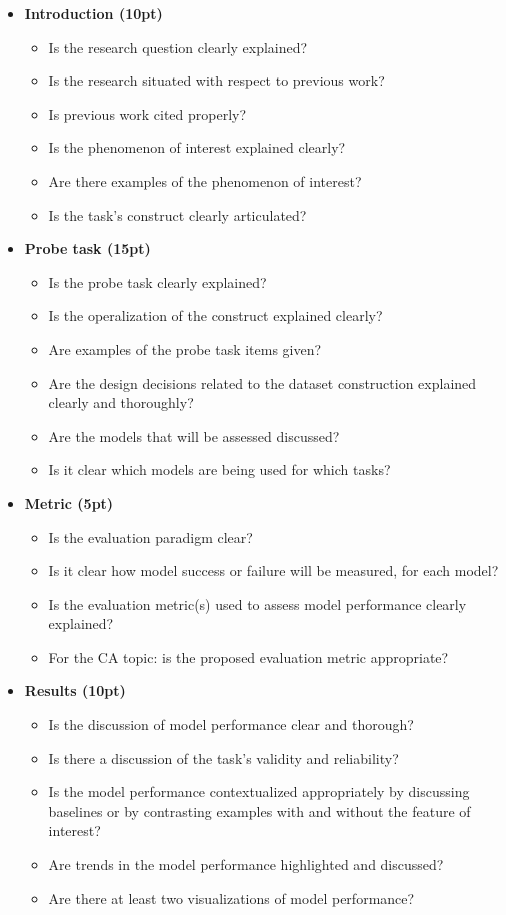 \documentclass[12pt,table]{article}
\begin{document}
\begin{itemize}
\item \textbf{Introduction (10pt)}
\begin{itemize}
\item Is the research question clearly explained?
\item Is the research situated with respect to previous work?
\item Is previous work cited properly?
\item Is the phenomenon of interest explained clearly?
\item Are there examples of the phenomenon of interest?
\item Is the task's construct clearly articulated?
\end{itemize}

\item \textbf{Probe task (15pt)}
\begin{itemize}
\item Is the probe task clearly explained?
\item Is the operalization of the construct explained clearly?
\item Are examples of the probe task items given?
\item Are the design decisions related to the dataset construction explained clearly and thoroughly?
\item Are the models that will be assessed discussed?
\item Is it clear which models are being used for which tasks?
\end{itemize}

\item \textbf{Metric (5pt)}
\begin{itemize}
\item Is the evaluation paradigm clear?
\item Is it clear how model success or failure will be measured, for each model?
\item Is the evaluation metric(s) used to assess model performance clearly explained?
\item For the CA topic: is the proposed evaluation metric appropriate?
\end{itemize}

\item \textbf{Results (10pt)}
\begin{itemize}
\item Is the discussion of model performance clear and thorough?
\item Is there a discussion of the task's validity and reliability?
\item Is the model performance contextualized appropriately by discussing baselines or by contrasting examples with and without the feature of interest?
\item Are trends in the model performance highlighted and discussed?
\item Are there at least two visualizations of model performance?
\end{itemize}


\end{itemize}
\end{document}
